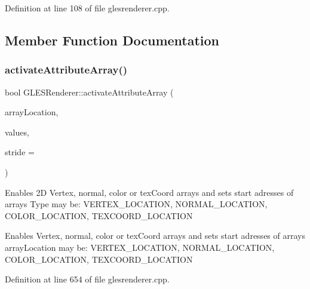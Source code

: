 Definition at line 108 of file glesrenderer.\+cpp.



\subsection{Member Function Documentation}
\mbox{\label{class_g_l_e_s_renderer_a8529c317862c57c027acce876bad17bb}} 
\subsubsection{\texorpdfstring{activateAttributeArray()}{activateAttributeArray()}\hspace{0.1cm}{\footnotesize\ttfamily [1/4]}}
{\footnotesize\ttfamily bool G\+L\+E\+S\+Renderer\+::activate\+Attribute\+Array (\begin{DoxyParamCaption}\item[{\mbox{\hyperlink{class_g_l_e_s_renderer_a05f4cf233d5cf60f4d6ea50ddc06a2c4}{Attribute\+Location}}}]{array\+Location,  }\item[{const Q\+Vector2D $\ast$}]{values,  }\item[{int}]{stride = {} }\end{DoxyParamCaption})}

Enables 2D Vertex, normal, color or tex\+Coord arrays and sets start adresses of arrays Type may be\+: V\+E\+R\+T\+E\+X\+\_\+\+L\+O\+C\+A\+T\+I\+ON, N\+O\+R\+M\+A\+L\+\_\+\+L\+O\+C\+A\+T\+I\+ON, C\+O\+L\+O\+R\+\_\+\+L\+O\+C\+A\+T\+I\+ON, T\+E\+X\+C\+O\+O\+R\+D\+\_\+\+L\+O\+C\+A\+T\+I\+ON

Enables Vertex, normal, color or tex\+Coord arrays and sets start adresses of arrays array\+Location may be\+: V\+E\+R\+T\+E\+X\+\_\+\+L\+O\+C\+A\+T\+I\+ON, N\+O\+R\+M\+A\+L\+\_\+\+L\+O\+C\+A\+T\+I\+ON, C\+O\+L\+O\+R\+\_\+\+L\+O\+C\+A\+T\+I\+ON, T\+E\+X\+C\+O\+O\+R\+D\+\_\+\+L\+O\+C\+A\+T\+I\+ON 

Definition at line 654 of file glesrenderer.\+cpp.

\mbox{\label{class_g_l_e_s_renderer_a102377bf45b15bb52324214d2e9b6f14}} 
